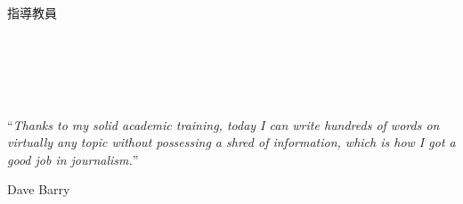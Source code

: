 \documentclass[
  letterpaper,
  11pt,
  english,
  singlespacing,
  headsepline]{MastersDoctoralThesis}
\begin{document}
\begin{titlepage}
\begin{center}
\textit{}\\[2.0cm]
\LARGE 指導教員　\supname\\[0.5cm] %
 
\vfill

\textit{}\\[0.5cm]
\LARGE\deptname\\
\LARGE\groupname\\[0.3cm] %
\LARGE\authorname\\[0cm]  %

\vfill




 
\vfill
\end{center}
\end{titlepage}

\begin{declaration}
\addchaptertocentry{\authorshipname} %


\end{declaration}

\cleardoublepage


\vspace*{0.2\textheight}

\noindent``{\itshape Thanks to my solid academic training, today I can
write hundreds of words on virtually any topic without possessing a
shred of information, which is how I got a good job in
journalism.}''\bigbreak

\hfill Dave Barry


\end{document}
